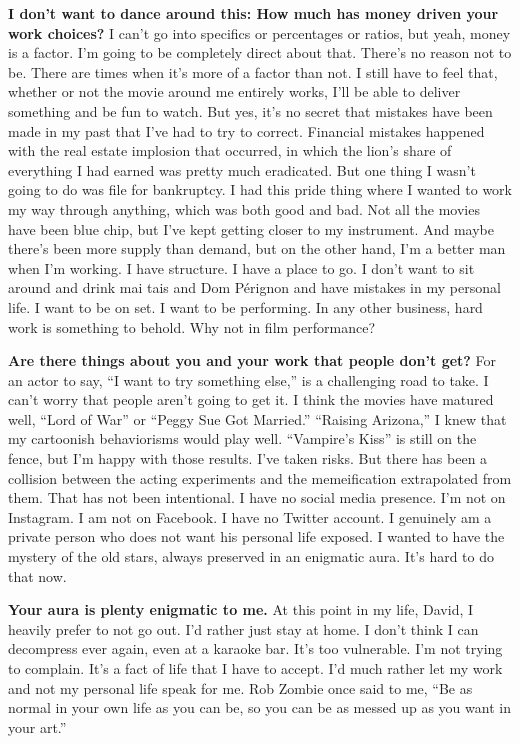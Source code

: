 \textbf{I don't want to dance around this: How much has money driven
your work choices?} I can't go into specifics or percentages or ratios,
but yeah, money is a factor. I'm going to be completely direct about
that. There's no reason not to be. There are times when it's more of a
factor than not. I still have to feel that, whether or not the movie
around me entirely works, I'll be able to deliver something and be fun
to watch. But yes, it's no secret that mistakes have been made in my
past that I've had to try to correct. Financial mistakes happened with
the real estate implosion that occurred, in which the lion's share of
everything I had earned was pretty much eradicated. But one thing I
wasn't going to do was file for bankruptcy. I had this pride thing where
I wanted to work my way through anything, which was both good and bad.
Not all the movies have been blue chip, but I've kept getting closer to
my instrument. And maybe there's been more supply than demand, but on
the other hand, I'm a better man when I'm working. I have structure. I
have a place to go. I don't want to sit around and drink mai tais and
Dom Pérignon and have mistakes in my personal life. I want to be on set.
I want to be performing. In any other business, hard work is something
to behold. Why not in film performance?

\textbf{Are there things about you and your work that people don't get?}
For an actor to say, ``I want to try something else,'' is a challenging
road to take. I can't worry that people aren't going to get it. I think
the movies have matured well, ``Lord of War'' or ``Peggy Sue Got
Married.'' ``Raising Arizona,'' I knew that my cartoonish behaviorisms
would play well. ``Vampire's Kiss'' is still on the fence, but I'm happy
with those results. I've taken risks. But there has been a collision
between the acting experiments and the memeification extrapolated from
them. That has not been intentional. I have no social media presence.
I'm not on Instagram. I am not on Facebook. I have no Twitter account. I
genuinely am a private person who does not want his personal life
exposed. I wanted to have the mystery of the old stars, always preserved
in an enigmatic aura. It's hard to do that now.

\textbf{Your aura is plenty enigmatic to me.} At this point in my life,
David, I heavily prefer to not go out. I'd rather just stay at home. I
don't think I can decompress ever again, even at a karaoke bar. It's too
vulnerable. I'm not trying to complain. It's a fact of life that I have
to accept. I'd much rather let my work and not my personal life speak
for me. Rob Zombie once said to me, ``Be as normal in your own life as
you can be, so you can be as messed up as you want in your art.''

